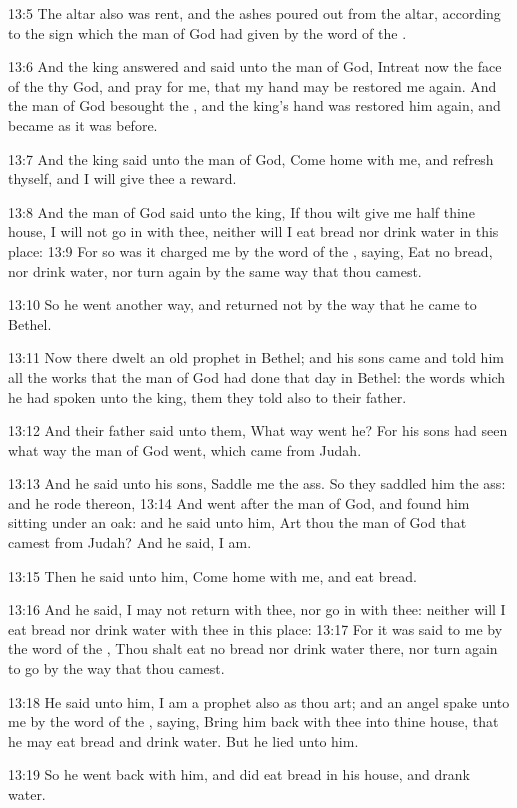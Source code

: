 13:5 The altar also was rent, and the ashes poured out from the altar, according to the sign which the man of God had given by the word of the \LORD.

13:6 And the king answered and said unto the man of God, Intreat now the face of the \LORD thy God, and pray for me, that my hand may be restored me again. And the man of God besought the \LORD, and the king's hand was restored him again, and became as it was before.

13:7 And the king said unto the man of God, Come home with me, and refresh thyself, and I will give thee a reward.

13:8 And the man of God said unto the king, If thou wilt give me half thine house, I will not go in with thee, neither will I eat bread nor drink water in this place: 13:9 For so was it charged me by the word of the \LORD, saying, Eat no bread, nor drink water, nor turn again by the same way that thou camest.

13:10 So he went another way, and returned not by the way that he came to Bethel.

13:11 Now there dwelt an old prophet in Bethel; and his sons came and told him all the works that the man of God had done that day in Bethel: the words which he had spoken unto the king, them they told also to their father.

13:12 And their father said unto them, What way went he? For his sons had seen what way the man of God went, which came from Judah.

13:13 And he said unto his sons, Saddle me the ass. So they saddled him the ass: and he rode thereon, 13:14 And went after the man of God, and found him sitting under an oak: and he said unto him, Art thou the man of God that camest from Judah? And he said, I am.

13:15 Then he said unto him, Come home with me, and eat bread.

13:16 And he said, I may not return with thee, nor go in with thee: neither will I eat bread nor drink water with thee in this place: 13:17 For it was said to me by the word of the \LORD, Thou shalt eat no bread nor drink water there, nor turn again to go by the way that thou camest.

13:18 He said unto him, I am a prophet also as thou art; and an angel spake unto me by the word of the \LORD, saying, Bring him back with thee into thine house, that he may eat bread and drink water. But he lied unto him.

13:19 So he went back with him, and did eat bread in his house, and drank water.

